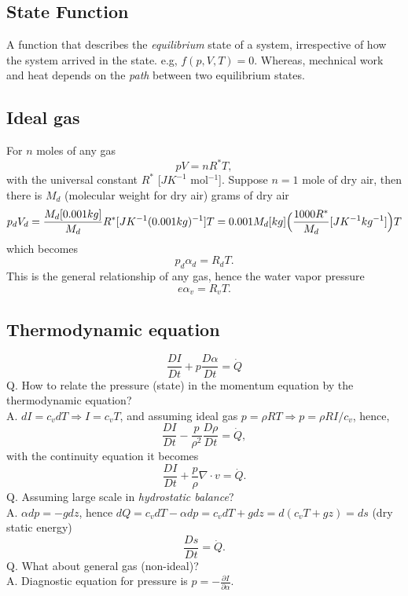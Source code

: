 
\subsection{State Function}
A function that describes the \emph{equilibrium} state of a system, irrespective of how the system arrived in the state.
e.g, $f(p,V,T)=0$. Whereas, mechnical work and heat depends on the \emph{path} between two equilibrium states. \\

\subsection{Ideal gas}
For $n$ moles of any gas
\begin{equation}
    pV = nR^*T,
\end{equation}
with the universal constant $R^*$ [$J K^{-1}$ mol$^{-1}$].
Suppose $n=1$ mole of dry air, then there is $M_d$ (molecular weight for dry air) grams of dry air
\begin{equation}
        p_d V_d  = \frac{M_d [0.001kg]}{M_d} R^* [J K^{-1} (0.001kg)^{-1}] T = 0.001M_d [kg] \Big(\frac{1000 R^*}{M_d} [J K^{-1} kg^{-1}]\Big) T \\
\end{equation}
which becomes
\begin{equation}
    p_d \alpha_d = R_d T.
\end{equation}
This is the general relationship of any gas, hence the water vapor pressure 
\begin{equation}
   e \alpha_v = R_v T.
\end{equation}

\subsection{Thermodynamic equation}
\begin{equation}
    \frac{DI}{Dt} + p \frac{D\alpha}{Dt} = \dot{Q}
\end{equation}
Q. How to relate the pressure (state) in the momentum equation by the thermodynamic equation? \\
A. $dI = c_v dT \Rightarrow I = c_v T$, and assuming ideal gas $p = \rho R T \Rightarrow p = \rho R I / c_v$,
hence,
\begin{equation}
    \frac{DI}{Dt} - \frac{p}{\rho^2} \frac{D\rho}{Dt} = \dot{Q},
\end{equation}
with the continuity equation it becomes
\begin{equation}
    \frac{DI}{Dt} + \frac{p}{\rho} \nabla \cdot v = \dot{Q}.
\end{equation}
Q. Assuming large scale in \emph{hydrostatic balance}? \\
A. $\alpha d p = -gdz$, hence $dQ = c_v dT - \alpha dp = c_v dT + gdz = d(c_v T + gz) = ds$ (dry static energy)
\begin{equation}
    \frac{Ds}{Dt} = \dot{Q}.
\end{equation}
Q. What about general gas (non-ideal)? \\
A. Diagnostic equation for pressure is $p = -\frac{\partial I}{\partial \alpha}$. \\

